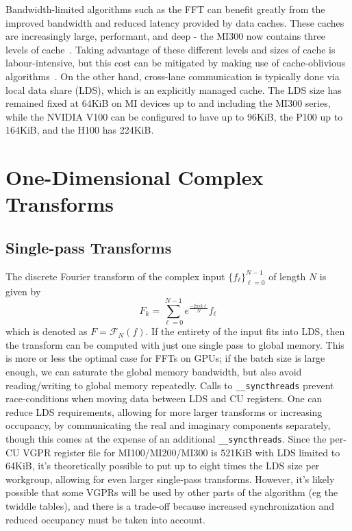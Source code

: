 \documentclass[blind]{gtac}
\def\({\left(}
\def\){\right)}
\begin{document}
Bandwidth-limited algorithms such as the FFT can benefit greatly from
the improved bandwidth and reduced latency provided by data caches.
These caches are increasingly large, performant, and deep - the MI300
now contains three levels of cache~\cite{amdgpuspecs}.  Taking
advantage of these different levels and sizes of cache is
labour-intensive, but this cost can be mitigated by making use of
cache-oblivious algorithms~\cite{frigo1999cache}.  On the other hand,
cross-lane communication is typically done via local data share (LDS),
which is an explicitly managed cache.  The LDS size has remained fixed
at 64KiB on MI devices up to and including the MI300 series, while the
NVIDIA V100 can be configured to have up to 96KiB, the P100 up to
164KiB, and the H100 has 224KiB.

\section{One-Dimensional Complex Transforms}
\label{section1d}
\subsection{Single-pass Transforms}

The discrete Fourier transform of the complex input
$\{f_\ell\}_{\ell=0}^{N-1}$ of length $N$ is given by
\begin{dmath}
  \label{dft}
  F_k = \sum_{\ell=0}^{N-1} e^{\frac{-2\pi{}ik\ell{}}{N}} f_\ell
\end{dmath}
which is denoted as $F = \mathcal{F}_N\(f\)$.  If the entirety of the
input fits into LDS, then the transform can be computed with just one
single pass to global memory.  This is more or less the optimal case
for FFTs on GPUs; if the batch size is large enough, we can saturate
the global memory bandwidth, but also avoid reading/writing to global
memory repeatedly.  Calls to \texttt{__syncthreads} prevent
race-conditions when moving data between LDS and CU registers.  One
can reduce LDS requirements, allowing for more larger transforms or
increasing occupancy, by communicating the real and imaginary
components separately, though this comes at the expense of an
additional \texttt{__syncthreads}.  Since the per-CU VGPR register
file for MI100/MI200/MI300 is 521KiB with LDS limited to 64KiB, it's
theoretically possible to put up to eight times the LDS size per
workgroup, allowing for even larger single-pass transforms.  However,
it's likely possible that some VGPRs will be used by other parts of
the algorithm (eg the twiddle tables), and there is a trade-off
because increased synchronization and reduced occupancy must be taken
into account.
\end{document}
